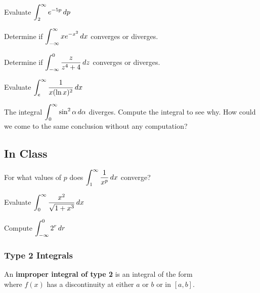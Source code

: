 \documentclass[notes]{subfiles}
\begin{document}
		\begin{ex}
			Evaluate $\displaystyle \int_2^\infty e^{-5p}\, dp$
		\end{ex}
			
		\begin{ex}
			Determine if $\displaystyle \int_{-\infty}^{\infty} xe^{-x^2}\, dx$ converges or diverges.
		\end{ex}
			\newpage
			
		\begin{ex}
			Determine if $\displaystyle \int_{-\infty}^0 \dfrac{z}{z^4 + 4}\, dz$ converges or diverges.
		\end{ex}
			
		\begin{ex}
			Evaluate $\displaystyle \int_e^\infty \dfrac{1}{x(\ln x)^2}\, dx$
		\end{ex}
			
		\begin{ex}
			The integral $\displaystyle \int_0^\infty \sin^2\alpha\, d\alpha$ diverges.  Compute the integral to see why.  How could we come to the same conclusion without any computation?
		\end{ex}
			\newpage
			
	\subsection*{In Class}
		\begin{ex}
			For what values of $p$ does $\displaystyle \int_1^\infty \dfrac{1}{x^p}\, dx$ converge?
		\end{ex}
		
		\begin{ex}
			Evaluate $\displaystyle \int_0^\infty \dfrac{x^2}{\sqrt{1+x^3}}\, dx$
		\end{ex}	
		
		\begin{ex}
			Compute $\displaystyle \int_{-\infty}^0 2^r\, dr$
		\end{ex}	
			\newpage
			
	\subsubsection*{Type 2 Integrals}

		\begin{defn}
			An \textbf{improper integral of type 2} is an integral of the form\\[70pt]
			where $f(x)$ has a discontinuity at either $a$ or $b$ or in $[a,b]$.
		\end{defn}
			
\end{document}
